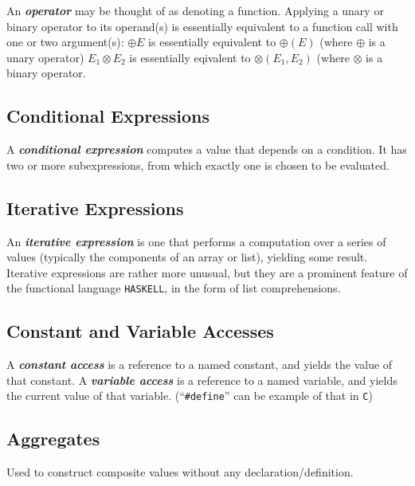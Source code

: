 \documentclass{article}
\begin{document}
An \textbf{\textit{operator}} may be thought of as denoting a function. Applying a unary or binary operator to its operand(s) is essentially equivalent to a function call with one or two argument(s):
$\oplus E$ is essentially equivalent to $\oplus(E)$ (where $\oplus$ is a unary operator)
$E_1 \otimes E_2$ is essentially eqivalent to $\otimes(E_1, E_2)$ (where $\otimes$ is a binary operator.

\subsection{Conditional Expressions}

A \textbf{\textit{conditional expression}} computes a value that depends on a condition. It has two or more subexpressions, from which exactly one is chosen to be evaluated.

\subsection{Iterative Expressions}

An \textbf{\textit{iterative expression}} is one that performs a computation over a series of values (typically the components of an array or list), yielding some result. Iterative expressions are rather more unusual, but they are a prominent feature of the functional language \texttt{HASKELL}, in the form of list comprehensions.

\subsection{Constant and Variable Accesses}

A \textbf{\textit{constant access}} is a reference to a named constant, and yields the value of that constant. A \textbf{\textit{variable access}} is a reference to a named variable, and yields the current value of that variable. (``\texttt{\#define}'' can be example of that in \texttt{C})

\subsection{Aggregates}

Used to construct composite values without any declaration/definition.
\end{document}

